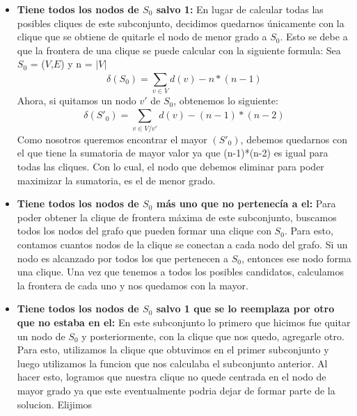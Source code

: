 \begin{itemize}
\item \textbf{Tiene todos los nodos de $S_{0}$ salvo 1:} \newline En lugar de calcular todas las posibles cliques de este subconjunto, decidimos quedarnos únicamente con la clique que se obtiene de quitarle el nodo de menor grado a $S_{0}$. Esto se debe a que la frontera de una clique se puede calcular con la siguiente formula:\newline
Sea $S_{0}$ = ($V$,$E$) y n = $|$$V$$|$
\begin{equation}
  \delta(S_{0}) = \sum_{v \in V}^{} d(v) - n*(n-1)
\end{equation}
Ahora, si quitamos un nodo $v'$ de $S_{0}$, obtenemos lo siguiente:
\begin{equation}
  \delta(S'_{0}) = \sum_{v \in V/v'}^{} d(v) - (n-1)*(n-2)
\end{equation}
Como nosotros queremos encontrar el mayor \delta$(S'_{0})$, debemos quedarnos con el que tiene la sumatoria de mayor valor ya que (n-1)*(n-2) es igual para todas las cliques. Con lo cual, el nodo que debemos eliminar para poder maximizar la sumatoria, es el de menor grado.
\item \textbf{Tiene todos los nodos de $S_{0}$ más uno que no pertenecía a el:} \newline
Para poder obtener la clique de frontera máxima de este subconjunto, buscamos todos los nodos del grafo que pueden formar una clique con $S_{0}$. Para esto, contamos cuantos nodos de la clique se conectan a cada nodo del grafo. Si un nodo es alcanzado por todos los que pertenecen a $S_{0}$, entonces ese nodo forma una clique. Una vez que tenemos a todos los posibles candidatos, calculamos la frontera de cada uno y nos quedamos con la mayor.
\item \textbf{Tiene todos los nodos de $S_{0}$ salvo 1 que se lo reemplaza por otro que no estaba en el:} \newline
En este subconjunto lo primero que hicimos fue quitar un nodo de $S_{0}$ y posteriormente, con la clique que nos quedo, agregarle otro. Para esto, utilizamos la clique que obtuvimos en el primer subconjunto y luego utilizamos la funcion que nos calculaba el subconjunto anterior. Al hacer esto, logramos que nuestra clique no quede centrada en el nodo de mayor grado ya que este eventualmente podria dejar de formar parte de la solucion. \newline
Elijimos 
\end{itemize}

